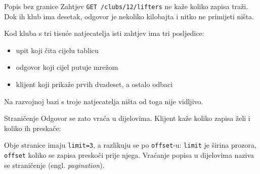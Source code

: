 \begin{frame}{Popis bez granice}
Zahtjev \texttt{GET /clubs/12/lifters} ne kaže koliko zapisa traži. Dok ih klub ima desetak, odgovor je nekoliko kilobajta i nitko ne primijeti ništa.

\vspace{1.1em}
Kod kluba s tri tisuće natjecatelja isti zahtjev ima tri posljedice:

\vspace{0.7em}
\begin{itemize}
  \itemsep0.6em
  \item upit koji čita cijelu tablicu
  \item odgovor koji cijel putuje mrežom
  \item klijent koji prikaže prvih dvadeset, a ostalo odbaci
\end{itemize}

\vspace{1.1em}
Na razvojnoj bazi s troje natjecatelja ništa od toga nije vidljivo.
\end{frame}

\begin{frame}{Straničenje}
Odgovor se zato vraća u dijelovima. Klijent kaže koliko zapisa želi i koliko ih preskače:

\vspace{1.1em}
\begin{center}
\end{center}

\vspace{1.1em}
Obje stranice imaju \texttt{limit=3}, a razlikuju se po \texttt{offset}-u: \texttt{limit} je širina prozora, \texttt{offset} koliko se zapisa preskoči prije njega. Vraćanje popisa u dijelovima naziva se straničenje (engl. \emph{pagination}).
\end{frame}

